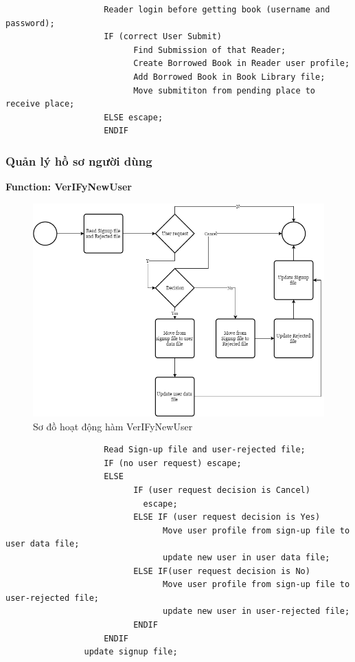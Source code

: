\documentclass[12pt,a4paper]{report}
\begin{document}
                \begin{verbatim}
                    Reader login before getting book (username and password);
                    IF (correct User Submit)
                          Find Submission of that Reader;
                          Create Borrowed Book in Reader user profile;
                          Add Borrowed Book in Book Library file;
                          Move submititon from pending place to receive place;
                    ELSE escape;
                    ENDIF
                \end{verbatim}
            \newpage
            \subsubsection{Quản lý hồ sơ người dùng}
                \textbf{Function: VerIFyNewUser}
                \begin{figure}[H]
                    \centering
                    \label{F:adduser}
                    \includegraphics[scale = .4]{adduser.png}
                    \caption{Sơ đồ hoạt động hàm VerIFyNewUser}
                \end{figure}
                \begin{verbatim}
                    Read Sign-up file and user-rejected file;
                    IF (no user request) escape;
                    ELSE
                          IF (user request decision is Cancel)
                            escape;
                          ELSE IF (user request decision is Yes)
                                Move user profile from sign-up file to user data file;
                                update new user in user data file;
                          ELSE IF(user request decision is No)
                                Move user profile from sign-up file to user-rejected file;
                                update new user in user-rejected file;
                          ENDIF
                    ENDIF
                update signup file;
                \end{verbatim}
\end{document}
